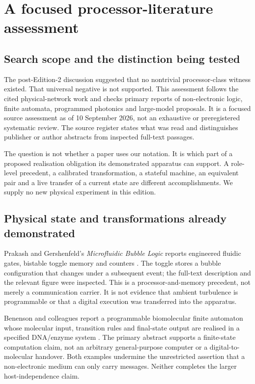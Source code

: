 \documentclass[11pt,a4paper]{article}
\theoremstyle{definition}
\theoremstyle{remark}
\begin{document}
\section{A focused processor-literature assessment}\label{sec:census}
\subsection{Search scope and the distinction being tested}
The post-Edition-2 discussion suggested that no nontrivial processor-class witness existed. That universal negative is not supported. This assessment follows the cited physical-network work and checks primary reports of non-electronic logic, finite automata, programmed photonics and large-model proposals. It is a focused source assessment as of 10 September 2026, not an exhaustive or preregistered systematic review. The source register states what was read and distinguishes publisher or author abstracts from inspected full-text passages.

The question is not whether a paper uses our notation. It is which part of a proposed realisation obligation its demonstrated apparatus can support. A role-level precedent, a calibrated transformation, a stateful machine, an equivalent pair and a live transfer of a current state are different accomplishments. We supply no new physical experiment in this edition.

\subsection{Physical state and transformations already demonstrated}
Prakash and Gershenfeld's \emph{Microfluidic Bubble Logic} reports engineered fluidic gates, bistable toggle memory and counters \citep{bubble}. The toggle stores a bubble configuration that changes under a subsequent event; the full-text description and the relevant figure were inspected. This is a processor-and-memory precedent, not merely a communication carrier. It is not evidence that ambient turbulence is programmable or that a digital execution was transferred into the apparatus.

Benenson and colleagues report a programmable biomolecular finite automaton whose molecular input, transition rules and final-state output are realised in a specified DNA/enzyme system \citep{benenson}. The primary abstract supports a finite-state computation claim, not an arbitrary general-purpose computer or a digital-to-molecular handover. Both examples undermine the unrestricted assertion that a non-electronic medium can only carry messages. Neither completes the larger host-independence claim.
\end{document}
